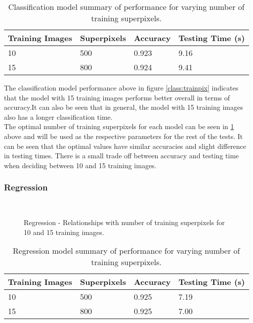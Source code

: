 \begin{table}[H]
\centering
\caption{Classification model summary of performance for varying number of training superpixels.}

\begin{tabular}{|l|l|l|l|}
\hline
 \textbf{Training Images} &	\textbf{Superpixels} & \textbf{Accuracy} & \textbf{Testing Time (s)}\\
\hline
10 & 500 & 0.923 & 9.16\\
\hline				    	 			
15 & 800 & 0.924 & 9.41\\	
\hline		    	 
\end{tabular}
\label{table:classtrainpix}
\end{table}

The classification model performance above in figure \ref{class:trainpix} indicates that the model with 15 training images performs better overall in terms of accuracy.It can also be seen that in general, the model with 15 training images also has a longer classification time.
\\[1\baselineskip]
The optimal number of training superpixels for each model can be seen in \ref{table:classtrainpix} above and will be used as the respective parameters for the rest of the tests. It can be seen that the optimal values have similar accuracies and slight difference in testing times. There is a small trade off between accuracy and testing time when deciding between 10 and 15 training images.


\subsubsection{Regression}
\begin{figure}[H]
    \centering
    \\
    \caption{Regression - Relationships with number of training superpixels for 10 and 15 training images.}%
    \label{reg:trainpix}
\end{figure}

\begin{table}[H]
\centering
\caption{Regression model summary of performance for varying number of training superpixels.}

\begin{tabular}{|l|l|l|l|}
\hline
 \textbf{Training Images} &	\textbf{Superpixels} & \textbf{Accuracy} & \textbf{Testing Time (s)}\\
\hline
10 & 500 & 0.925 & 7.19\\
\hline				    	 			
15 & 800 & 0.925& 7.00\\	
\hline		    	 
\end{tabular}
\label{table:regtrainpix}
\end{table}

